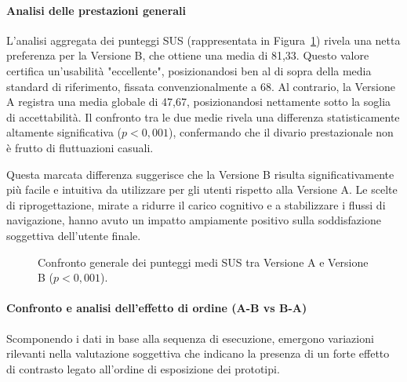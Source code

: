 \paragraph{Analisi delle prestazioni generali}
L'analisi aggregata dei punteggi SUS (rappresentata in Figura~\ref{fig:6-sus-1}) rivela una netta preferenza per la Versione B, che ottiene una media di 81,33. Questo valore certifica un'usabilità "eccellente", posizionandosi ben al di sopra della media standard di riferimento, fissata convenzionalmente a 68. Al contrario, la Versione A registra una media globale di 47,67, posizionandosi nettamente sotto la soglia di accettabilità. Il confronto tra le due medie rivela una differenza statisticamente altamente significativa ($p < 0{,}001$), confermando che il divario prestazionale non è frutto di fluttuazioni casuali.

Questa marcata differenza suggerisce che la Versione B risulta significativamente più facile e intuitiva da utilizzare per gli utenti rispetto alla Versione A. Le scelte di riprogettazione, mirate a ridurre il carico cognitivo e a stabilizzare i flussi di navigazione, hanno avuto un impatto ampiamente positivo sulla soddisfazione soggettiva dell'utente finale.

\begin{figure}[H]
	\centering
	\caption{Confronto generale dei punteggi medi SUS tra Versione A e Versione B ($p < 0{,}001$).}
	\label{fig:6-sus-1}
\end{figure}

\paragraph{Confronto e analisi dell'effetto di ordine (A-B vs B-A)}
Scomponendo i dati in base alla sequenza di esecuzione, emergono variazioni rilevanti nella valutazione soggettiva che indicano la presenza di un forte effetto di contrasto legato all'ordine di esposizione dei prototipi.

